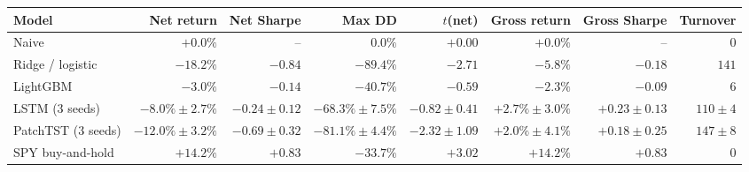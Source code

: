 \begin{tabular}{lrrrrrrr}
\toprule
Model & Net return & Net Sharpe & Max DD & $t$(net) & Gross return & Gross Sharpe & Turnover \\
\midrule
Naive & $+0.0\%$ & -- & $0.0\%$ & $+0.00$ & $+0.0\%$ & -- & $0$ \\
Ridge / logistic & $-18.2\%$ & $-0.84$ & $-89.4\%$ & $-2.71$ & $-5.8\%$ & $-0.18$ & $141$ \\
LightGBM & $-3.0\%$ & $-0.14$ & $-40.7\%$ & $-0.59$ & $-2.3\%$ & $-0.09$ & $6$ \\
LSTM (3 seeds) & $-8.0\% \pm 2.7\%$ & $-0.24 \pm 0.12$ & $-68.3\% \pm 7.5\%$ & $-0.82 \pm 0.41$ & $+2.7\% \pm 3.0\%$ & $+0.23 \pm 0.13$ & $110 \pm 4$ \\
PatchTST (3 seeds) & $-12.0\% \pm 3.2\%$ & $-0.69 \pm 0.32$ & $-81.1\% \pm 4.4\%$ & $-2.32 \pm 1.09$ & $+2.0\% \pm 4.1\%$ & $+0.18 \pm 0.25$ & $147 \pm 8$ \\
SPY buy-and-hold & $+14.2\%$ & $+0.83$ & $-33.7\%$ & $+3.02$ & $+14.2\%$ & $+0.83$ & $0$ \\
\bottomrule
\end{tabular}
